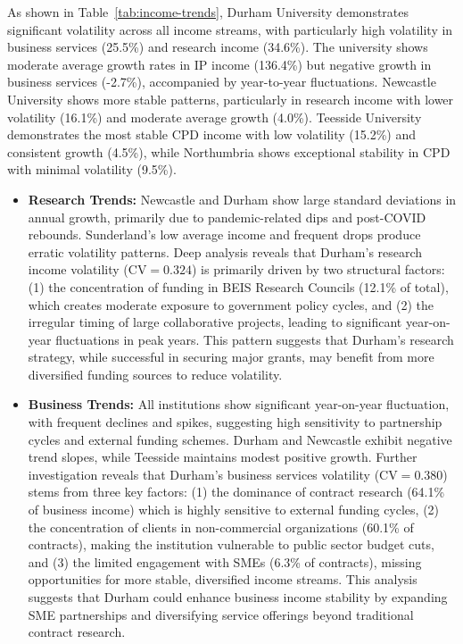 \documentclass[journal,onecolumn, 10pt,draftclsnofoot]{IEEEtran}
\begin{document}
As shown in Table~\ref{tab:income-trends}, Durham University demonstrates significant volatility across all income streams, with particularly high volatility in business services (25.5\%) and research income (34.6\%). The university shows moderate average growth rates in IP income (136.4\%) but negative growth in business services (-2.7\%), accompanied by year-to-year fluctuations. Newcastle University shows more stable patterns, particularly in research income with lower volatility (16.1\%) and moderate average growth (4.0\%). Teesside University demonstrates the most stable CPD income with low volatility (15.2\%) and consistent growth (4.5\%), while Northumbria shows exceptional stability in CPD with minimal volatility (9.5\%).

\begin{itemize}
    \item \textbf{Research Trends:} Newcastle and Durham show large standard deviations in annual growth, primarily due to pandemic-related dips and post-COVID rebounds. Sunderland's low average income and frequent drops produce erratic volatility patterns. Deep analysis reveals that Durham's research income volatility ($\mathrm{CV}=0.324$) is primarily driven by two structural factors: (1) the concentration of funding in BEIS Research Councils (12.1\% of total), which creates moderate exposure to government policy cycles, and (2) the irregular timing of large collaborative projects, leading to significant year-on-year fluctuations in peak years. This pattern suggests that Durham's research strategy, while successful in securing major grants, may benefit from more diversified funding sources to reduce volatility.
    
    \item \textbf{Business Trends:} All institutions show significant year-on-year fluctuation, with frequent declines and spikes, suggesting high sensitivity to partnership cycles and external funding schemes. Durham and Newcastle exhibit negative trend slopes, while Teesside maintains modest positive growth. Further investigation reveals that Durham's business services volatility ($\mathrm{CV}=0.380$) stems from three key factors: (1) the dominance of contract research (64.1\% of business income) which is highly sensitive to external funding cycles, (2) the concentration of clients in non-commercial organizations (60.1\% of contracts), making the institution vulnerable to public sector budget cuts, and (3) the limited engagement with SMEs (6.3\% of contracts), missing opportunities for more stable, diversified income streams. This analysis suggests that Durham could enhance business income stability by expanding SME partnerships and diversifying service offerings beyond traditional contract research.
    

\end{itemize}
\end{document}
